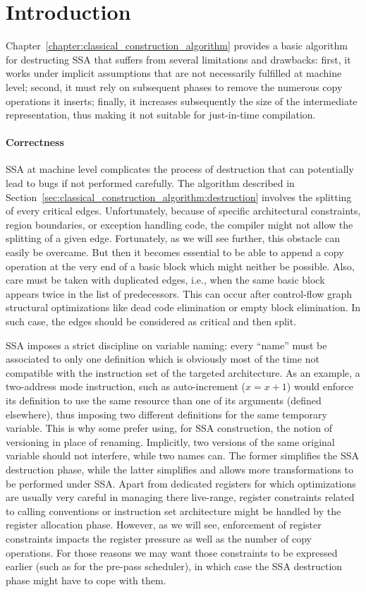 \section{Introduction}
Chapter~\ref{chapter:classical_construction_algorithm} provides a basic algorithm for destructing SSA that suffers from several limitations and drawbacks: first, it works under implicit assumptions that are not necessarily fulfilled at machine level; second, it must rely on subsequent phases to remove the numerous copy operations it inserts; finally, it increases subsequently the size of the intermediate representation, thus making it not suitable for just-in-time compilation.   

\paragraph{Correctness}
SSA at machine level complicates the process of destruction that can potentially lead to bugs if not performed carefully. The algorithm described in Section~\ref{sec:classical_construction_algorithm:destruction} involves the splitting of every critical edges. Unfortunately, because of specific architectural constraints, region boundaries, or exception handling code, the compiler might not allow the splitting of a given edge. Fortunately, as we will see further, this obstacle can easily be overcame. But then it becomes essential to be able to append a copy operation at the very end of a basic block which might neither be possible. Also, care must be taken with duplicated edges, i.e., when the same basic block appears twice in the list of predecessors.
This can occur after control-flow graph structural optimizations like
dead code elimination or empty block elimination.
In such case, the edges should be considered as critical and then split.

SSA imposes a strict discipline on variable naming: every ``name'' must be associated to only one definition which is obviously most of the time not compatible with the instruction set of the targeted architecture. As an example, a two-address mode instruction, such as auto-increment ($x=x+1$) would enforce its definition to use the same resource than one of its arguments (defined elsewhere), thus imposing two different definitions for the same temporary variable. This is why some prefer using, for SSA construction, the notion of versioning in place of renaming. Implicitly, two versions of the same original variable should not interfere, while two names can. The former simplifies the SSA destruction phase, while the latter simplifies and allows more transformations to be performed under SSA. Apart from dedicated registers for which optimizations are usually very careful in managing there live-range, register constraints related to calling conventions or instruction set architecture might be handled by the register allocation phase. However, as we will see, enforcement of register constraints impacts the register pressure as well as the number of copy operations. For those reasons we may want those constraints to be expressed earlier (such as for the pre-pass scheduler), in which case the SSA destruction phase might have to cope with them.

